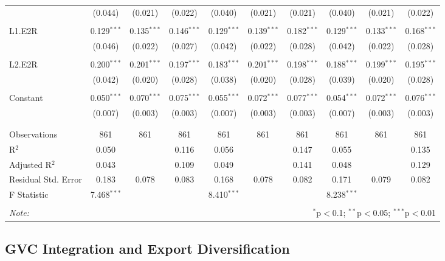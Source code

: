 \documentclass[a4paper]{article}
\begin{document}
\begin{table}[!htbp]
{\begin{tabular}{@{\extracolsep{5pt}}lccccccccc}
  & (0.044) & (0.021) & (0.022) & (0.040) & (0.021) & (0.021) & (0.040) & (0.021) & (0.022) \\ 
  & & & & & & & & & \\ 
 L1.E2R & 0.129$^{***}$ & 0.135$^{***}$ & 0.146$^{***}$ & 0.129$^{***}$ & 0.139$^{***}$ & 0.182$^{***}$ & 0.129$^{***}$ & 0.133$^{***}$ & 0.168$^{***}$ \\ 
  & (0.046) & (0.022) & (0.027) & (0.042) & (0.022) & (0.028) & (0.042) & (0.022) & (0.028) \\ 
  & & & & & & & & & \\ 
 L2.E2R & 0.200$^{***}$ & 0.201$^{***}$ & 0.197$^{***}$ & 0.183$^{***}$ & 0.201$^{***}$ & 0.198$^{***}$ & 0.188$^{***}$ & 0.199$^{***}$ & 0.195$^{***}$ \\ 
  & (0.042) & (0.020) & (0.028) & (0.038) & (0.020) & (0.028) & (0.039) & (0.020) & (0.028) \\ 
  & & & & & & & & & \\ 
 Constant & 0.050$^{***}$ & 0.070$^{***}$ & 0.075$^{***}$ & 0.055$^{***}$ & 0.072$^{***}$ & 0.077$^{***}$ & 0.054$^{***}$ & 0.072$^{***}$ & 0.076$^{***}$ \\ 
  & (0.007) & (0.003) & (0.003) & (0.007) & (0.003) & (0.003) & (0.007) & (0.003) & (0.003) \\ 
  & & & & & & & & & \\ 
\hline \\[-1.8ex] 
Observations & 861 & 861 & 861 & 861 & 861 & 861 & 861 & 861 & 861 \\ 
R$^{2}$ & 0.050 &  & 0.116 & 0.056 &  & 0.147 & 0.055 &  & 0.135 \\ 
Adjusted R$^{2}$ & 0.043 &  & 0.109 & 0.049 &  & 0.141 & 0.048 &  & 0.129 \\ 
Residual Std. Error & 0.183 & 0.078 & 0.083 & 0.168 & 0.078 & 0.082 & 0.171 & 0.079 & 0.082 \\ 
F Statistic & 7.468$^{***}$ &  &  & 8.410$^{***}$ &  &  & 8.238$^{***}$ &  &  \\ 
\hline 
\hline \\[-1.8ex] 
\textit{Note:}  & \multicolumn{9}{r}{$^{*}$p$<$0.1; $^{**}$p$<$0.05; $^{***}$p$<$0.01} \\ 
\end{tabular} 
}
\end{table} 
\FloatBarrier

\subsection{GVC Integration and Export Diversification}
\end{document}
